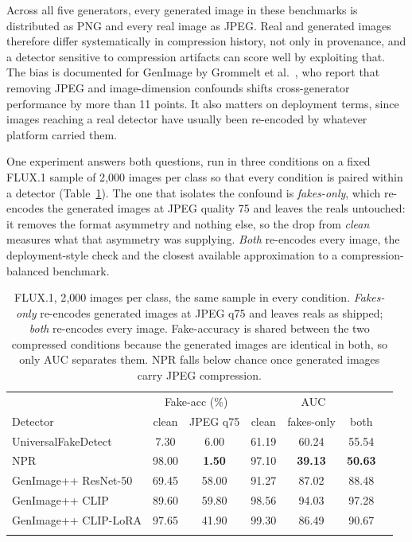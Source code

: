 \documentclass[3p,times,procedia]{elsarticle}
\begin{document}
Across all five generators, every generated image in these benchmarks is
distributed as PNG and every real image as JPEG. Real and generated images
therefore differ systematically in compression history, not only in
provenance, and a detector sensitive to compression artifacts can score
well by exploiting that. The bias is documented for GenImage by Grommelt
et al.~\cite{grommelt2024jpeg}, who report that removing JPEG and
image-dimension confounds shifts cross-generator performance by more than
11 points. It also matters on deployment terms, since images reaching a
real detector have usually been re-encoded by whatever platform carried
them.

One experiment answers both questions, run in three conditions on a fixed
FLUX.1 sample of 2{,}000 images per class so that every condition is
paired within a detector (Table~\ref{tab:compression}). The one that
isolates the confound is \emph{fakes-only}, which re-encodes the generated
images at JPEG quality 75 and leaves the reals untouched: it removes the
format asymmetry and nothing else, so the drop from \emph{clean} measures
what that asymmetry was supplying. \emph{Both} re-encodes every image, the
deployment-style check and the closest available approximation to a
compression-balanced benchmark.

\begin{table}[h]
\caption{FLUX.1, 2{,}000 images per class, the same sample in every
condition. \emph{Fakes-only} re-encodes generated images at JPEG q75 and
leaves reals as shipped; \emph{both} re-encodes every image. Fake-accuracy
is shared between the two compressed conditions because the generated
images are identical in both, so only AUC separates them. NPR falls below
chance once generated images carry JPEG compression.}
\label{tab:compression}
\begin{tabular*}{\hsize}{@{\extracolsep{\fill}}lcccccc@{}}
\toprule
& \multicolumn{2}{c}{Fake-acc (\%)} & \multicolumn{3}{c}{AUC} \\
Detector & clean & JPEG q75 & clean & fakes-only & both \\
\colrule
UniversalFakeDetect & 7.30 & 6.00 & 61.19 & 60.24 & 55.54 \\
NPR & 98.00 & \textbf{1.50} & 97.10 & \textbf{39.13} & \textbf{50.63} \\
GenImage++ ResNet-50 & 69.45 & 58.00 & 91.27 & 87.02 & 88.48 \\
GenImage++ CLIP & 89.60 & 59.80 & 98.56 & 94.03 & 97.28 \\
GenImage++ CLIP-LoRA & 97.65 & 41.90 & 99.30 & 86.49 & 90.67 \\
\botrule
\end{tabular*}
\end{table}
\end{document}
